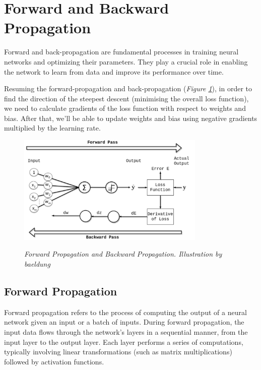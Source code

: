 \newpage

\section{Forward and Backward Propagation}

Forward and back-propagation are fundamental processes in training neural
networks and optimizing their parameters. They play a crucial role in enabling
the network to learn from data and improve its performance over time. \newline

Resuming the forward-propagation and back-propagation (\textit{Figure
\ref{fig:forward-and-back-propagation}}), in order to find the direction of the
steepest descent (minimising the overall loss function), we need to calculate
gradients of the loss function with respect to weights and bias. After that,
we’ll be able to update weights and bias using negative gradients multiplied by
the learning rate.

\begin{figure}[H]
  \centering
  \includegraphics[width=0.8\textwidth]{imatges/preliminaries/front-and-back-prop.png}
  \caption[Forward Propagation and Backward Propagation]{\textit{Forward Propagation and Backward Propagation. Illustration by baeldung}}
  {\label{fig:forward-and-back-propagation}}
\end{figure}


\subsection{Forward Propagation}

Forward propagation refers to the process of computing the output of a neural
network given an input or a batch of inputs. During forward propagation, the
input data flows through the network's layers in a sequential manner, from the
input layer to the output layer. Each layer performs a series of computations,
typically involving linear transformations (such as matrix multiplications)
followed by activation functions. \newline

